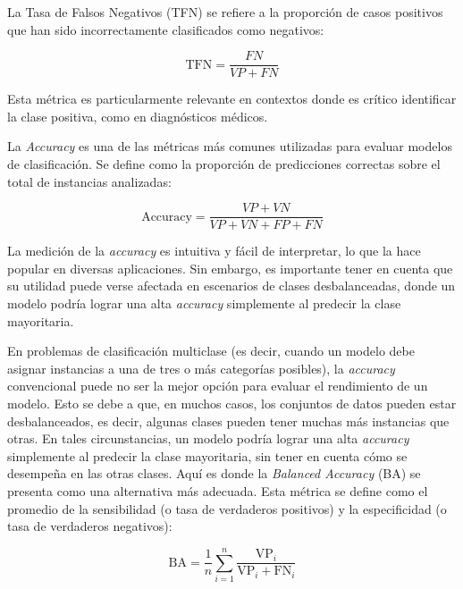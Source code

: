 La Tasa de Falsos Negativos (TFN) se refiere a la proporción de casos positivos que han sido incorrectamente clasificados como negativos:

\begin{equation}
    \text{TFN} = \frac{FN}{VP + FN}
\end{equation}

Esta métrica es particularmente relevante en contextos donde es crítico identificar la clase positiva, como en diagnósticos médicos.


La \textit{Accuracy} es una de las métricas más comunes utilizadas para evaluar modelos de clasificación. Se define como la proporción de predicciones correctas sobre el total de instancias analizadas:

\begin{equation}
    \text{Accuracy} = \frac{VP + VN}{VP + VN + FP + FN}
\end{equation}

La medición de la \textit{accuracy} es intuitiva y fácil de interpretar, lo que la hace popular en diversas aplicaciones. Sin embargo, es importante tener en cuenta que su utilidad puede verse afectada en escenarios de clases desbalanceadas, donde un modelo podría lograr una alta \textit{accuracy} simplemente al predecir la clase mayoritaria.

En problemas de clasificación multiclase (es decir, cuando un modelo debe asignar instancias a una de tres o más categorías posibles), la \textit{accuracy} convencional puede no ser la mejor opción para evaluar el rendimiento de un modelo. Esto se debe a que, en muchos casos, los conjuntos de datos pueden estar desbalanceados, es decir, algunas clases pueden tener muchas más instancias que otras. En tales circunstancias, un modelo podría lograr una alta \textit{accuracy} simplemente al predecir la clase mayoritaria, sin tener en cuenta cómo se desempeña en las otras clases. Aquí es donde la \textit{Balanced Accuracy} (BA) se presenta como una alternativa más adecuada. Esta métrica se define como el promedio de la sensibilidad (o tasa de verdaderos positivos) y la especificidad (o tasa de verdaderos negativos):

\begin{equation}
    \text{BA} = \frac{1}{n} \sum_{i=1}^{n} \frac{\text{VP}_i}{\text{VP}_i + \text{FN}_i}
\end{equation}

